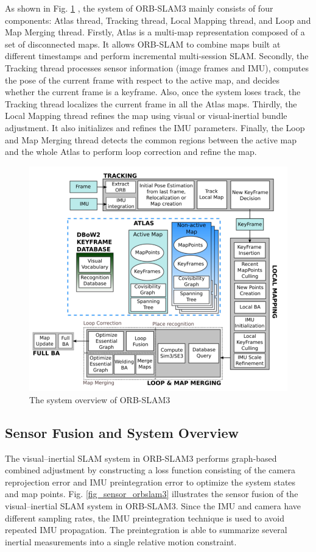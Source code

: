 \documentclass[letterpaper, 10 pt, conference]{ieeeconf}  %
\begin{document}
As shown in Fig. \ref{fig_orbslam3} \cite{orbslam3}, the system of ORB-SLAM3 mainly consists of four components: Atlas thread, Tracking thread, Local Mapping thread, and Loop and Map Merging thread. Firstly, Atlas is a multi-map representation composed of a set of disconnected maps. It allows ORB-SLAM to combine maps built at different timestamps and perform incremental multi-session SLAM. Secondly, the Tracking thread processes sensor information (image frames and IMU), computes the pose of the current frame with respect to the active map, and decides whether the current frame is a keyframe. Also, once the system loses track, the Tracking thread localizes the current frame in all the Atlas maps. Thirdly, the Local Mapping thread refines the map using visual or visual-inertial bundle adjustment. It also initializes and refines the IMU parameters. Finally, the Loop and Map Merging thread detects the common regions between the active map and the whole Atlas to perform loop correction and refine the map.

\begin{figure}
\centering
\includegraphics[scale=0.5]{orbslam.jpg}
\caption{The system overview of ORB-SLAM3 \cite{orbslam3}}
\label{fig_orbslam3}
\end{figure}


\subsection{Sensor Fusion and System Overview}
The visual–inertial SLAM system in ORB-SLAM3 performs graph-based combined adjustment by constructing a loss function consisting of the camera reprojection error and IMU preintegration error to optimize the system states and map points. Fig. \ref{fig_sensor_orbslam3} illustrates the sensor fusion of the visual–inertial SLAM system in ORB-SLAM3. Since the IMU and camera have different sampling rates, the IMU preintegration technique \cite{12} is used to avoid repeated IMU propagation. The preintegration is able to summarize several inertial measurements into a single relative motion constraint.
\end{document}

